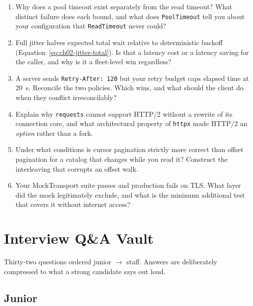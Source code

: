 \begin{enumerate}
  \item Why does a pool timeout exist separately from the read timeout? What
        distinct failure does each bound, and what does \texttt{PoolTimeout}
        tell you about your configuration that \texttt{ReadTimeout} never
        could?
  \item Full jitter halves expected total wait relative to deterministic
        backoff (Equation~\ref{eq:ch02-jitter-total}). Is that a latency cost
        or a latency saving for the caller, and why is it a fleet-level win
        regardless?
  \item A server sends \texttt{Retry-After: 120} but your retry budget caps
        elapsed time at 20~s. Reconcile the two policies. Which wins, and
        what should the client do when they conflict irreconcilably?
  \item Explain why \texttt{requests} cannot support HTTP/2 without a rewrite
        of its connection core, and what architectural property of
        \texttt{httpx} made HTTP/2 an \emph{option} rather than a fork.
  \item Under what conditions is cursor pagination strictly more correct than
        offset pagination for a catalog that changes while you read it?
        Construct the interleaving that corrupts an offset walk.
  \item Your MockTransport suite passes and production fails on TLS. What
        layer did the mock legitimately exclude, and what is the minimum
        additional test that covers it without internet access?
\end{enumerate}


\section{Interview Q\&A Vault}
\label{sec:ch02-interview}

Thirty-two questions ordered junior $\rightarrow$ staff. Answers are
deliberately compressed to what a strong candidate says out loud.

\subsection{Junior}

